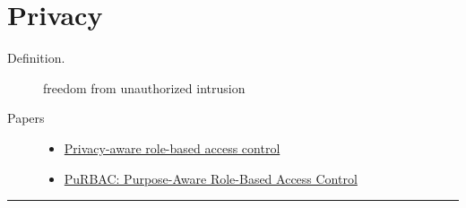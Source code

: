 \documentclass[letterpaper,10pt,english]{sphinxmanual}
\begin{document}
\chapter{Privacy}
\label{categories/privacy::doc}\label{categories/privacy:privacy}\begin{description}
\item[{Definition.}] \leavevmode
freedom from unauthorized intrusion

\item[{Papers}] \leavevmode\begin{itemize}
\item {} 
\href{http://dl.acm.org/citation.cfm?id=1266848}{Privacy-aware role-based access control}

\item {} 
\href{http://www.sis.pitt.edu/~amirreza/papers/masoumzadeh2008\_purbac.pdf}{PuRBAC: Purpose-Aware Role-Based Access Control}

\end{itemize}

\end{description}


\bigskip\hrule{}\bigskip
\end{document}
